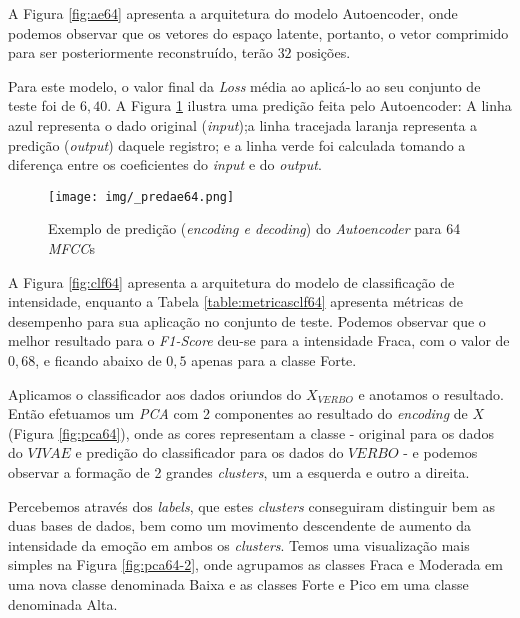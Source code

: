 
A Figura \ref{fig:ae64} apresenta a arquitetura do modelo Autoencoder, onde podemos observar que os vetores do espaço latente, portanto, o vetor comprimido para ser posteriormente reconstruído, terão $32$ posições.

Para este modelo, o valor final da \textit{Loss} média ao aplicá-lo ao seu conjunto de teste foi de $6,40$. A Figura \ref{fig:predae64} ilustra uma predição feita pelo Autoencoder: A linha azul representa o dado original (\textit{input});a linha tracejada laranja representa a predição (\textit{output}) daquele registro; e a linha verde foi calculada tomando a diferença entre os coeficientes do \textit{input} e do \textit{output}.

\begin{figure}[h]
    \centering
    \texttt{[image: img/\_predae64.png]}
    \caption{\label{fig:predae64}Exemplo de predição (\textit{encoding e decoding}) do \textit{Autoencoder} para 64 \textit{MFCC}s}
\end{figure}

A Figura \ref{fig:clf64} apresenta a arquitetura do modelo de classificação de intensidade, enquanto a Tabela \ref{table:metricasclf64} apresenta métricas de desempenho para sua aplicação no conjunto de teste. Podemos observar que o melhor resultado para o \textit{F1-Score} deu-se para a intensidade Fraca, com o valor de $0,68$, e ficando abaixo de $0,5$ apenas para a classe Forte.

Aplicamos o classificador aos dados oriundos do $X_{VERBO}$ e anotamos o resultado. Então efetuamos um \textit{PCA} com 2 componentes ao resultado do \textit{encoding} de $X$ (Figura \ref{fig:pca64}), onde as cores representam a classe - original para os dados do $VIVAE$ e predição do classificador para os dados do $VERBO$ - e podemos observar a formação de 2 grandes \textit{clusters}, um a esquerda e outro a direita.

Percebemos através dos \textit{labels}, que estes \textit{clusters} conseguiram distinguir bem as duas bases de dados, bem como um movimento descendente de aumento da intensidade da emoção em ambos os \textit{clusters}. Temos uma visualização mais simples na Figura \ref{fig:pca64-2}, onde agrupamos as classes Fraca e Moderada em uma nova classe denominada Baixa e as classes Forte e Pico em uma classe denominada Alta.

